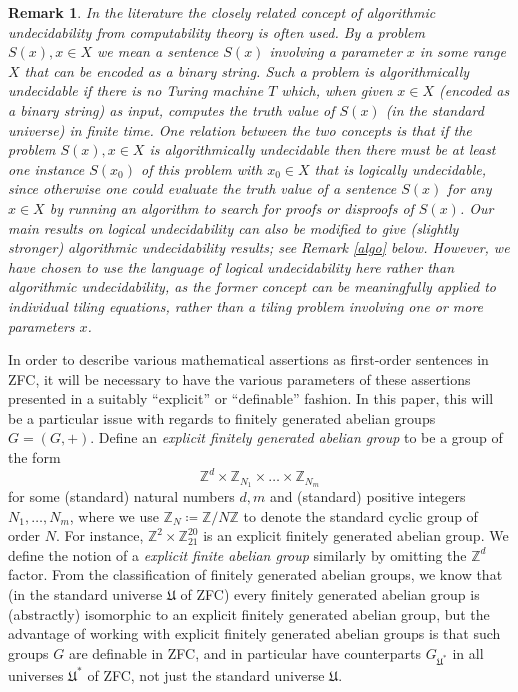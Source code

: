 \documentclass[reqno,a4paper,12pt]{amsart}
\numberwithin{equation}{section}
\numberwithin{figure}{section}
\def\Z{\mathbb{Z}}
\newcommand{\Universe}{{\mathfrak{U}}}
\theoremstyle{plain}
\newtheorem{remark}[thm]{Remark}
\theoremstyle{definition}
\begin{document}
\begin{remark}\label{algo-logic}  In the literature the closely related concept of \emph{algorithmic undecidability} from computability theory is often used.  By a \emph{problem} $S(x), x \in X$ we mean a sentence $S(x)$ involving a parameter $x$ in some range $X$ that can be encoded as a binary string. Such a problem is \emph{algorithmically undecidable} if there is no Turing machine $T$ which, when given $x \in X$ (encoded as a binary string) as input, computes the truth value of $S(x)$ (in the standard universe) in finite time.  One relation between the two concepts is that if the problem $S(x), x \in X$ is algorithmically undecidable then there must be at least one instance $S(x_0)$ of this problem with $x_0 \in X$ that is logically undecidable, since otherwise one could evaluate the truth value of a sentence $S(x)$ for any $x \in X$ by running an algorithm to search for proofs or disproofs of $S(x)$.  Our main results on logical undecidability can also be modified to give (slightly stronger) algorithmic undecidability results; see Remark \ref{algo} below.  However, we have chosen to use the language of logical undecidability here rather than algorithmic undecidability, as the former concept can be meaningfully applied to individual tiling equations, rather than a tiling problem involving one or more parameters $x$.
\end{remark}

In order to describe various mathematical assertions as first-order sentences in ZFC, it will be necessary to have the various parameters of these assertions presented in a suitably ``explicit'' or ``definable'' fashion.  In this paper, this will be a particular issue with regards to finitely generated abelian groups $G = (G,+)$.  Define an \emph{explicit finitely generated abelian group} to be a group of the form
\begin{equation}\label{explicit-group}
\Z^d \times \Z_{N_1} \times \dots \times \Z_{N_m}
\end{equation}
for some (standard) natural numbers $d, m$ and (standard) positive integers $N_1,\dots,N_m$, where we use $\Z_N \coloneqq \Z/N\Z$ to denote the standard cyclic group of order $N$.  For instance, $\Z^2 \times \Z_{21}^{20}$ is an explicit finitely generated abelian group.  We define the notion of a \emph{explicit finite abelian group} similarly by omitting the $\Z^d$ factor.  From the classification of finitely generated abelian groups, we know that (in the standard universe $\Universe$ of ZFC) every finitely generated abelian group is (abstractly) isomorphic to an explicit finitely generated abelian group, but the advantage of working with explicit finitely generated abelian groups is that such groups $G$ are definable in ZFC, and in particular have counterparts $G_{\Universe^*}$ in all universes $\Universe^*$ of ZFC, not just the standard universe $\Universe$.
\end{document}
